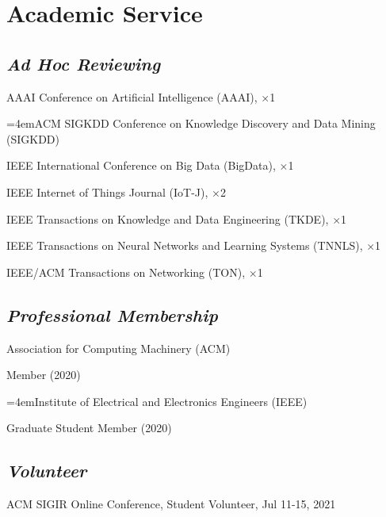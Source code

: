 
\vspace{-8pt}
\section*{Academic Service}
\vspace{-4pt}


\subsection*{\textnormal{\textit{Ad Hoc Reviewing}}}
\vspace{-4pt}
\indent

AAAI Conference on Artificial Intelligence (AAAI), $\times$1

\hangindent=4emACM SIGKDD Conference on Knowledge Discovery and Data Mining (SIGKDD)

IEEE International Conference on Big Data (BigData), $\times$1

IEEE Internet of Things Journal (IoT-J), $\times$2

IEEE Transactions on Knowledge and Data Engineering (TKDE), $\times$1

IEEE Transactions on Neural Networks and Learning Systems (TNNLS), $\times$1

IEEE/ACM Transactions on Networking (TON), $\times$1

\subsection*{\textnormal{\textit{Professional Membership}}}
\vspace{-4pt}
\indent 

Association for Computing Machinery (ACM)  

\hspace{2em}Member (2020)

\hangindent=4emInstitute of Electrical and Electronics Engineers (IEEE)

\hspace{2em}Graduate Student Member (2020)



\subsection*{\textnormal{\textit{Volunteer}}}
\vspace{-4pt}
\indent 

ACM SIGIR Online Conference, Student Volunteer, Jul 11-15, 2021
